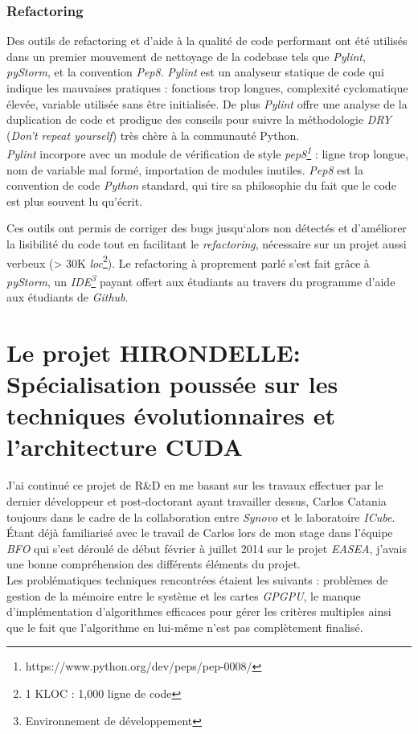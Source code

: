 \documentclass[french, 11pt]{memoir}
\begin{document}
\subsubsection{Refactoring}\label{refactoring}

Des outils de refactoring et d'aide à la qualité de code performant ont
été utilisés dans un premier mouvement de nettoyage de la codebase tels
que \emph{Pylint}, \emph{pyStorm}, et la convention
\emph{Pep8}. \emph{Pylint} est un analyseur statique de code qui indique
les mauvaises pratiques : fonctions trop longues, complexité
cyclomatique élevée, variable utilisée sans être initialisée. De plus
\emph{Pylint} offre une analyse de la duplication de code et prodigue
des conseils pour suivre la méthodologie \emph{DRY} (\emph{Don't repeat
yourself}) très chère à la communauté Python. \\
\emph{Pylint} incorpore
avec un module de vérification de style \emph{pep8\footnote{https://www.python.org/dev/peps/pep-0008/}} : ligne trop longue,
nom de variable mal formé, importation de modules inutiles. \textit{Pep8} est
la convention de code \emph{Python} standard, qui tire sa philosophie du
fait que le code est plus souvent lu qu'écrit. 

\bigskip
Ces outils ont permis de
corriger des bugs jusqu`alors non détectés et d'améliorer la lisibilité
du code tout en facilitant le \emph{refactoring}, nécessaire sur un
projet aussi verbeux (\textgreater{} 30K \textit{loc}\footnote{1 KLOC : 1,000 ligne de code}). Le refactoring à
proprement parlé s'est fait grâce à \emph{pyStorm}, un \emph{IDE\footnote{Environnement de développement}} payant
offert aux étudiants au travers du programme d'aide aux étudiants de
\emph{Github}.

\section{Le projet HIRONDELLE: Spécialisation poussée sur les techniques
évolutionnaires et l'architecture
CUDA}\label{le-projet-hirondelle-spuxe9cialisation-poussuxe9e-sur-les-techniques-uxe9volutionnaires-et-larchitecture-cuda}

J'ai continué ce projet de R\&D en me basant sur les travaux effectuer
par le dernier développeur et post-doctorant ayant travailler dessus,
Carlos Catania toujours dans le cadre de la collaboration entre
\emph{Synovo} et le laboratoire \emph{ICube}. \\
Étant déjà familiarisé avec
le travail de Carlos lors de mon stage dans l'équipe \emph{BFO} qui
s'est déroulé de début février à juillet 2014 sur le projet
\emph{EASEA}, j'avais une bonne compréhension des différents éléments du
projet. \\
Les problématiques techniques rencontrées étaient les suivants :
problèmes de gestion de la mémoire entre le système et les cartes
\emph{GPGPU}, le manque d'implémentation d'algorithmes efficaces pour
gérer les critères multiples ainsi que le fait que l'algorithme en
lui-même n'est pas complètement finalisé.
\end{document}
